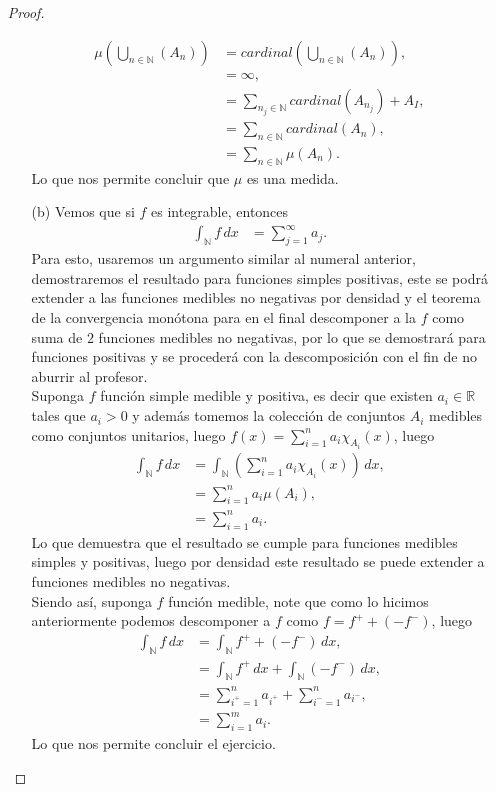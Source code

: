 \begin{enumerate}
\begin{proof}
\begin{enumerate}
\begin{align*}
        \mu\left( \bigcup_{n\in\mathbb{N}}(A_{n}) \right)&=cardinal\left( \bigcup_{n\in\mathbb{N}}(A_{n}) \right),\\
        &=\infty,\\
        &=\sum_{n_{j}\in\mathbb{N}}cardinal\left( A_{n_{j}} \right)+A_{I},\\
        &=\sum_{n\in\mathbb{N}}cardinal\left( A_{n} \right),\\
        &=\sum_{n\in\mathbb{N}}\mu(A_{n}).
      \end{align*}
      Lo que nos permite concluir que $\mu$ es una medida.\\
    \item[(b)] Vemos que si $f$ es integrable, entonces
      \begin{align*}
        \int_{\mathbb{N}}f\, dx&=\sum_{j=1}^{\infty}a_{j}.
      \end{align*}
      Para esto, usaremos un argumento similar al numeral anterior, demostraremos el resultado para funciones simples positivas, este se podrá extender a las funciones medibles no negativas por densidad y el teorema de la convergencia monótona para en el final descomponer a la $f$ como suma de $2$ funciones medibles no negativas, por lo que se demostrará para funciones positivas y se procederá con la descomposición con el fin de no aburrir al profesor.\\
      Suponga $f$ función simple medible y positiva, es decir que existen $a_{i}\in\mathbb{R}$ tales que $a_{i}>0$ y además tomemos la colección de conjuntos $A_{i}$ medibles como conjuntos unitarios, luego $f(x)=\sum_{i=1}^{n}a_{i}\chi_{A_{i}}(x)$, luego
      \begin{align*}
        \int_{\mathbb{N}}f\, dx&=\int_{\mathbb{N}}\left( \sum_{i=1}^{n}a_{i}\chi_{A_{i}}(x) \right)\, dx,\\
        &=\sum_{i=1}^{n}a_{i}\mu(A_{i}),\\
        &=\sum_{i=1}^{n}a_{i}.
      \end{align*}
      Lo que demuestra que el resultado se cumple para funciones medibles simples y positivas, luego por densidad este resultado se puede extender a funciones medibles no negativas.\\
      Siendo así, suponga $f$ función medible, note que como lo hicimos anteriormente podemos descomponer a $f$ como $f=f^{+} + (-f^{-})$, luego
      \begin{align*}
        \int_{\mathbb{N}}f\, dx&=\int_{\mathbb{N}}f^{+}+(-f^-)\, dx,\\
        &=\int_{\mathbb{N}}f^+\, dx + \int_{\mathbb{N}}(-f^-)\, dx,\\
        &=\sum_{i^+=1}^{n}a_{i^{+}}+\sum_{i^{-}=1}^{n}a_{i^{-}},\\
        &=\sum_{i=1}^{m}a_{i}.
      \end{align*}
      Lo que nos permite concluir el ejercicio.
  \end{enumerate}
\end{proof}
\end{enumerate}


